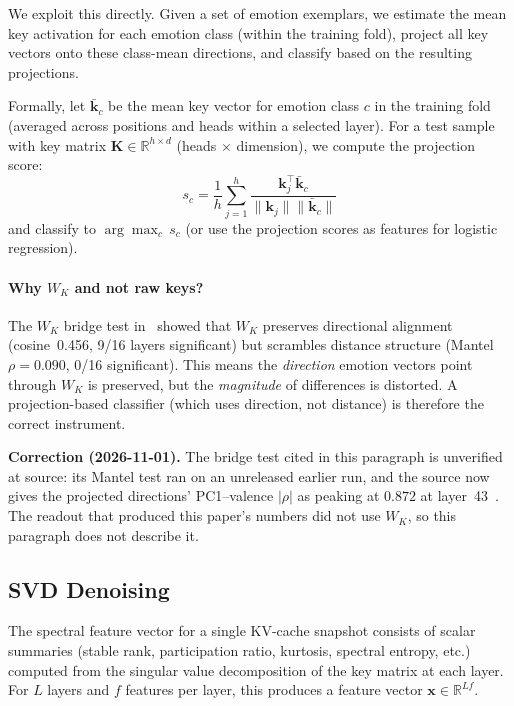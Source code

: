 \documentclass[11pt,a4paper]{article}
\begin{document}
We exploit this directly. Given a set of emotion exemplars, we estimate the
mean key activation for each emotion class (within the training fold), project
all key vectors onto these class-mean directions, and classify based on the
resulting projections.

Formally, let $\bar{\mathbf{k}}_c$ be the mean key vector for emotion class
$c$ in the training fold (averaged across positions and heads within a
selected layer). For a test sample with key matrix $\mathbf{K} \in
\mathbb{R}^{h \times d}$ (heads $\times$ dimension), we compute the
projection score:
\begin{equation}
    s_c = \frac{1}{h} \sum_{j=1}^{h} \frac{\mathbf{k}_j^\top \bar{\mathbf{k}}_c}{\|\mathbf{k}_j\| \|\bar{\mathbf{k}}_c\|}
\end{equation}
and classify to $\arg\max_c\, s_c$ (or use the projection scores as features
for logistic regression).

\paragraph{Why $W_K$ and not raw keys?} The $W_K$ bridge test
in~\citet{lyra_p4} showed that $W_K$ preserves directional alignment
(cosine~0.456, 9/16 layers significant) but scrambles distance structure
(Mantel $\rho = 0.090$, 0/16 significant). This means the \emph{direction}
emotion vectors point through $W_K$ is preserved, but the \emph{magnitude} of
differences is distorted. A projection-based classifier (which uses direction,
not distance) is therefore the correct instrument.

\noindent\textbf{Correction (2026-11-01).} The bridge test cited in this
paragraph is unverified at source: its Mantel test ran on an unreleased
earlier run, and the source now gives the projected directions' PC1--valence
$|\rho|$ as peaking at $0.872$ at layer~43~\citep{lyra_p4}. The readout that
produced this paper's numbers did not use $W_K$, so this paragraph does not
describe it.

\subsection{SVD Denoising}
\label{sec:svd_denoise}

The spectral feature vector for a single KV-cache snapshot consists of scalar
summaries (stable rank, participation ratio, kurtosis, spectral entropy, etc.)
computed from the singular value decomposition of the key matrix at each
layer. For $L$ layers and $f$ features per layer, this produces a feature
vector $\mathbf{x} \in \mathbb{R}^{Lf}$.
\end{document}

